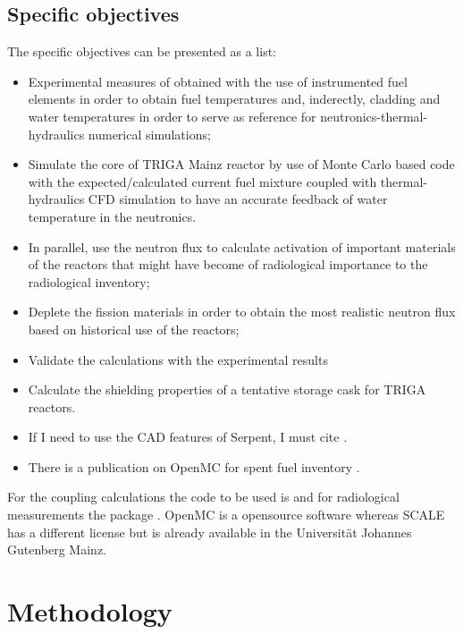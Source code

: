 \documentclass[11pt]{article} %
\begin{document}
\subsection{Specific objectives}

The specific objectives can be presented as a list:
\begin{itemize}
  \item  Experimental measures of obtained with the use of instrumented fuel elements in order to obtain fuel temperatures and, inderectly, cladding and water temperatures in order to serve as reference for neutronics-thermal-hydraulics numerical simulations;
  \item Simulate the core of TRIGA Mainz reactor by use of Monte Carlo based code with the expected/calculated current fuel mixture coupled with thermal-hydraulics CFD simulation to have an accurate feedback of water temperature in the neutronics. 
  \item In parallel, use the neutron flux to calculate activation of important materials of the reactors that might have become of radiological importance to the radiological inventory;
  \item Deplete the fission materials in order to obtain the most realistic neutron flux based on historical use of the reactors;
  \item Validate the calculations with the experimental results
  \item Calculate the shielding properties of a tentative storage cask for TRIGA reactors.
  \item If I need to use the CAD features of Serpent, I must cite \cite{Leppanen_2022}.
  \item There is a publication on OpenMC for spent fuel inventory \cite{Pineda_2025}.
\end{itemize}

For the coupling calculations the code to be used is \cite{OpenMC_2015} and for radiological measurements the package \cite{SCALE_632}. OpenMC is a opensource software whereas SCALE has a different license but is already available in the Universität Johannes Gutenberg Mainz.


\section{Methodology}
\end{document}
